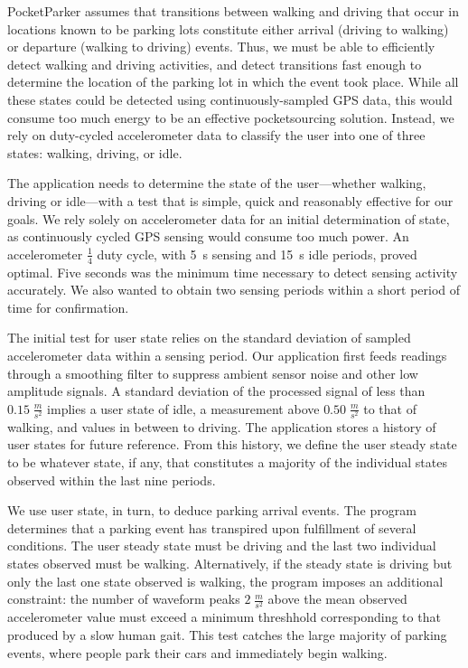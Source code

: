 PocketParker assumes that transitions between walking and driving that occur
in locations known to be parking lots constitute either arrival (driving to
walking) or departure (walking to driving) events. Thus, we must be able to
efficiently detect walking and driving activities, and detect transitions
fast enough to determine the location of the parking lot in which the event
took place. While all these states could be detected using
continuously-sampled GPS data, this would consume too much energy to be an
effective pocketsourcing solution. Instead, we rely on duty-cycled
accelerometer data to classify the user into one of three states: walking,
driving, or idle.

The application needs to determine the state of the user---whether walking,
driving or idle---with a test that is simple, quick and reasonably effective
for our goals.  We rely solely on accelerometer data for an initial
determination of state, as continuously cycled GPS sensing would consume too
much power. An accelerometer $\frac{1}{4}$ duty cycle, with 5~s sensing and
15~s idle periods, proved optimal. Five seconds was the minimum time
necessary to detect sensing activity accurately. We also wanted to obtain two
sensing periods within a short period of time for confirmation.

The initial test for user state relies on the standard deviation of sampled
accelerometer data within a sensing period. Our application first feeds
readings through a smoothing filter to suppress ambient sensor noise and
other low amplitude signals. A standard deviation of the processed signal of
less than $0.15\;\frac{m}{s^2}$ implies a user state of idle, a measurement
above $0.50\;\frac{m}{s^2}$ to that of walking, and values in between to
driving. The application stores a history of user states for future
reference. From this history, we define the user steady state to be whatever
state, if any, that constitutes a majority of the individual states observed
within the last nine periods.

We use user state, in turn, to deduce parking arrival events. The program
determines that a parking event has transpired upon fulfillment of several
conditions. The user steady state must be driving and the last two
individual states observed must be walking. Alternatively, if the steady
state is driving but only the last one state observed is walking, the program
imposes an additional constraint: the number of waveform peaks
$2\;\frac{m}{s^2}$ above the mean observed accelerometer value must exceed
a minimum threshhold corresponding to that produced by a slow human gait.
This test catches the large majority of parking events, where people park
their cars and immediately begin walking.

